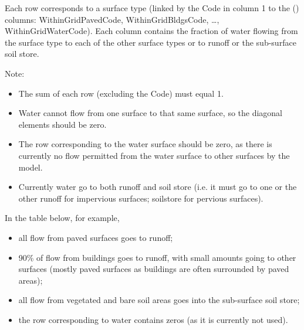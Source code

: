 \documentclass[letterpaper,10pt,english]{sphinxmanual}
\begin{document}
Each row corresponds to a surface type (linked by the Code in column 1
to the {\hyperref[\detokenize{input_files/SUEWS_SiteInfo/SUEWS_SiteSelect:suews-siteselect-txt}]{}} () columns:
WithinGridPavedCode, WithinGridBldgsCode, …, WithinGridWaterCode). Each
column contains the fraction of water flowing from the surface type to
each of the other surface types or to runoff or the sub-surface soil
store.

Note:
\begin{itemize}
\item {} 
The sum of each row (excluding the Code) must equal 1.

\item {} 
Water cannot flow from one surface to that same surface, so the
diagonal elements should be zero.

\item {} 
The row corresponding to the water surface should be zero, as there
is currently no flow permitted from the water surface to other
surfaces by the model.

\item {} 
Currently water  go to both runoff and soil store (i.e. it
must go to one or the other \textendash{} runoff for impervious surfaces;
soilstore for pervious surfaces).

\end{itemize}

In the table below, for example,
\begin{itemize}
\item {} 
all flow from paved surfaces goes to runoff;

\item {} 
90\% of flow from buildings goes to runoff, with small amounts going
to other surfaces (mostly paved surfaces as buildings are often
surrounded by paved areas);

\item {} 
all flow from vegetated and bare soil areas goes into the sub-surface
soil store;

\item {} 
the row corresponding to water contains zeros (as it is currently not
used).

\end{itemize}
\end{document}
